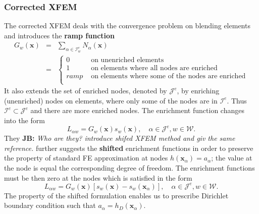 \documentclass[preprint,12pt]{elsarticle}
\def\vc#1{\mathbf{\boldsymbol{#1}}}     %
\newcommand{\bx}{\vc{x}}
\newcommand{\noteJB}[1]{{\color{Blue} \textbf{JB: } \textit{#1}}}
\begin{document}
\subsubsection{Corrected XFEM}
The corrected XFEM \cite{cxfem} deals with the convergence problem on blending elements and 
introduces the \textbf{ramp function}
\begin{eqnarray} \label{eqn:ramp_function}
  G_w(\bx) &=& \sum \limits_{\alpha\in\mathcal{I}_w^e} N_\alpha(\bx)    \\
  &=& 
  \begin{cases}
    0 & \textrm{ on unenriched elements}    \\
    1 & \textrm{ on elements where all nodes are enriched}    \\
    ramp & \textrm{ on elements where some of the nodes are enriched}    \\
  \end{cases} \nonumber
\end{eqnarray}
It also extends the set of enriched nodes, denoted by $\mathcal{J}^e$, by enriching (unenriched) nodes 
on elements, where only some of the nodes are in $\mathcal{I}^e$. Thus $\mathcal{I}^e\subset\mathcal{J}^e$ 
and there are more enriched nodes.
The enrichment function changes into the form
\begin{equation} \label{eqn:xfem_ramp}
    L_{\alpha w} = G_w(\bx) s_{w}(\bx), \quad \alpha\in\mathcal{J}^e, w\in\mathcal{W}.
\end{equation}
They 
\noteJB{Who are they? introduce shifed XFEM method and giv the same reference.}
further suggests the \textbf{shifted} enrichment functions in order to preserve the property of standard 
FE approximation at nodes $h(\bx_\alpha)=a_\alpha$; the value at the node is equal the corresponding degree
of freedom. The enrichment functions must be then zero at the nodes which is satisfied in the form
\begin{equation} \label{eqn:xfem_shift}
    L_{\alpha w} = G_w(\bx) \left[s_w(\bx) - s_w(\bx_\alpha)\right],
    \quad \alpha\in\mathcal{J}^e, w\in\mathcal{W}.
\end{equation} 
The property of the shifted formulation enables us to prescribe Dirichlet boundary condition such that
$a_\alpha = h_D(\bx_\alpha)$.
\end{document}

